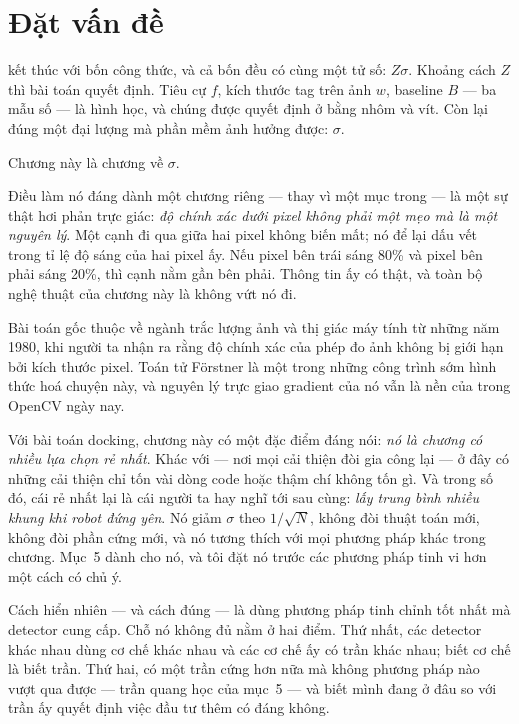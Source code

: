 \documentclass[../../marker.tex]{subfiles}
\begin{document}
\section{Đặt vấn đề}

 kết thúc với bốn công thức, và cả bốn đều có cùng một tử số: \(Z\sigma\). Khoảng cách \(Z\) thì bài toán quyết định. Tiêu cự \(f\), kích thước tag trên ảnh \(w\), baseline \(B\) --- ba mẫu số --- là hình học, và chúng được quyết định ở  bằng nhôm và vít. Còn lại đúng một đại lượng mà phần mềm ảnh hưởng được: \(\sigma\).

Chương này là chương về \(\sigma\).

Điều làm nó đáng dành một chương riêng --- thay vì một mục trong  --- là một sự thật hơi phản trực giác: \emph{độ chính xác dưới pixel không phải một mẹo mà là một nguyên lý}. Một cạnh đi qua giữa hai pixel không biến mất; nó để lại dấu vết trong tỉ lệ độ sáng của hai pixel ấy. Nếu pixel bên trái sáng 80\% và pixel bên phải sáng 20\%, thì cạnh nằm gần bên phải. Thông tin ấy có thật, và toàn bộ nghệ thuật của chương này là không vứt nó đi.

Bài toán gốc thuộc về ngành trắc lượng ảnh và thị giác máy tính từ những năm 1980, khi người ta nhận ra rằng độ chính xác của phép đo ảnh không bị giới hạn bởi kích thước pixel. Toán tử Förstner \cite{forstner1987fast} là một trong những công trình sớm hình thức hoá chuyện này, và nguyên lý trực giao gradient của nó vẫn là nền của  trong OpenCV ngày nay.

Với bài toán docking, chương này có một đặc điểm đáng nói: \emph{nó là chương có nhiều lựa chọn rẻ nhất}. Khác với  --- nơi mọi cải thiện đòi gia công lại --- ở đây có những cải thiện chỉ tốn vài dòng code hoặc thậm chí không tốn gì. Và trong số đó, cái rẻ nhất lại là cái người ta hay nghĩ tới sau cùng: \emph{lấy trung bình nhiều khung khi robot đứng yên}. Nó giảm \(\sigma\) theo \(1/\sqrt{N}\), không đòi thuật toán mới, không đòi phần cứng mới, và nó tương thích với mọi phương pháp khác trong chương. Mục~5 dành cho nó, và tôi đặt nó trước các phương pháp tinh vi hơn một cách có chủ ý.

Cách hiển nhiên --- và cách đúng --- là dùng phương pháp tinh chỉnh tốt nhất mà detector cung cấp. Chỗ nó không đủ nằm ở hai điểm. Thứ nhất, các detector khác nhau dùng cơ chế khác nhau và các cơ chế ấy có trần khác nhau; biết cơ chế là biết trần. Thứ hai, có một trần cứng hơn nữa mà không phương pháp nào vượt qua được --- trần quang học của  mục~5 --- và biết mình đang ở đâu so với trần ấy quyết định việc đầu tư thêm có đáng không.
\end{document}
